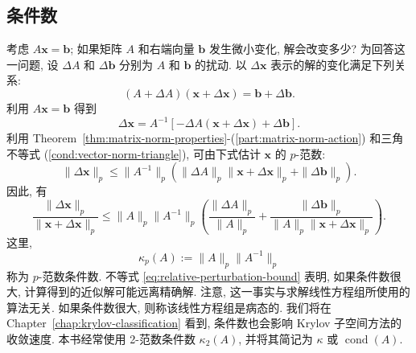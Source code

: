 \subsection{{条件数}}\label{sec:condition-number}
{考虑 $A\bm x=\bm b$; 如果矩阵 $A$ 和右端向量 $\bm b$ 发生微小变化, 解会改变多少? 为回答这一问题, 设 $\Delta A$ 和 $\Delta\bm b$ 分别为 $A$ 和 $\bm b$ 的扰动. 以 $\Delta\bm x$ 表示的解的变化满足下列关系:}
\[
(A+\Delta A)(\bm x+\Delta\bm x)=\bm b+\Delta\bm b.
\]
{利用 $A\bm x=\bm b$ 得到}
\[
\Delta\bm x=A^{-1}[-\Delta A(\bm x+\Delta\bm x)+\Delta\bm b].
\]
{利用 Theorem~\ref{thm:matrix-norm-properties}-(\ref{part:matrix-norm-action}) 和三角不等式 (\ref{cond:vector-norm-triangle}), 可由下式估计 $\bm x$ 的 $p$-范数:}
\[
\|\Delta\bm x\|_p\le\|A^{-1}\|_p(\|\Delta A\|_p\|\bm x+\Delta\bm x\|_p+\|\Delta\bm b\|_p).
\]
{因此, 有}
\begin{equation}\label{eq:relative-perturbation-bound}
\frac{\|\Delta\bm x\|_p}{\|\bm x+\Delta\bm x\|_p}
\le\|A\|_p\|A^{-1}\|_p
\left(\frac{\|\Delta A\|_p}{\|A\|_p}+
\frac{\|\Delta\bm b\|_p}{\|A\|_p\|\bm x+\Delta\bm x\|_p}\right).
\end{equation}
{这里,}
\begin{equation}\label{eq:p-norm-condition-number}
\kappa_p(A):=\|A\|_p\|A^{-1}\|_p
\end{equation}
{称为 $p$-范数条件数. 不等式 \eqref{eq:relative-perturbation-bound} 表明, 如果条件数很大, 计算得到的近似解可能远离精确解. 注意, 这一事实与求解线性方程组所使用的算法无关.}
{如果条件数很大, 则称该线性方程组是病态的. 我们将在 Chapter~\ref{chap:krylov-classification} 看到, 条件数也会影响 Krylov 子空间方法的收敛速度.}
{本书经常使用 2-范数条件数 $\kappa_2(A)$, 并将其简记为 $\kappa$ 或 $\operatorname{cond}(A)$.}
